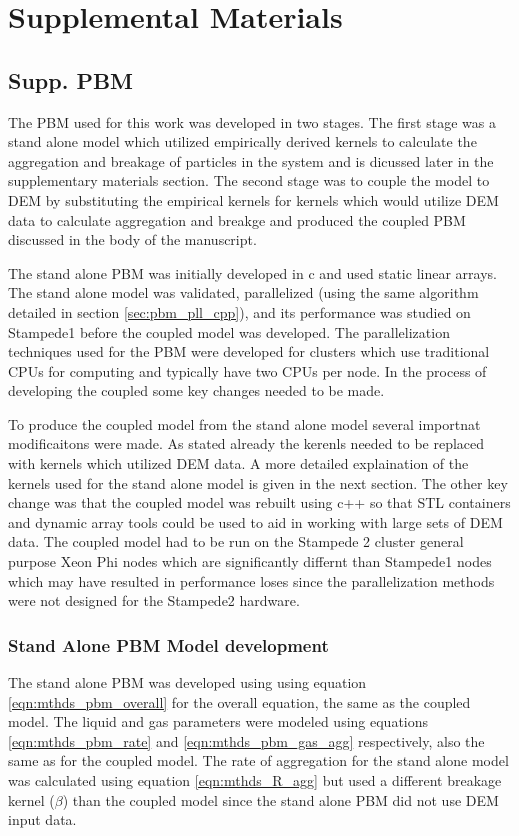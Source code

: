 
\section{Supplemental Materials}

\subsection{Supp. PBM}
\label{sec:supp_pbm_model}

	The PBM used for this work was developed in two stages. The first stage was a stand alone model 
which utilized empirically derived kernels to calculate the aggregation and breakage of particles in the system and is dicussed later in the supplementary materials section. The second stage was to couple the model to DEM by 
substituting the empirical kernels for kernels which would utilize DEM data to calculate aggregation and breakge and produced the coupled PBM discussed in the body of the manuscript. 
	
	The stand alone PBM was initially developed in c  and used static linear arrays. The stand alone model was validated, parallelized (using the same algorithm detailed in section \ref{sec:pbm_pll_cpp}), and its performance was studied on Stampede1 before the coupled model was developed. The parallelization techniques used for the PBM were developed for clusters which use traditional CPUs for computing and typically have two CPUs per node. In the process of developing the coupled some key changes needed to be made. 
	
	To produce the coupled model from the stand alone model several importnat modificaitons were made. As stated already the kerenls needed to be replaced with kernels which utilized DEM data. A more detailed explaination of the kernels used for the stand alone model is given in the next section. The other key change was that the coupled model was rebuilt using c++ so that STL containers and dynamic array tools could be used to aid in working with large sets of DEM data. The coupled model had to be run on the Stampede 2 cluster general purpose Xeon Phi nodes which are significantly differnt than Stampede1 nodes which may have resulted in performance loses since the parallelization methods were not designed for the Stampede2 hardware. 


\subsubsection{Stand Alone PBM Model development}
\label{sec:supp_sa_pbm_dev}
The stand alone PBM was developed using using equation \ref{eqn:mthds_pbm_overall} for the overall 
equation, the same as the coupled model. The liquid and gas parameters were modeled using equations \ref{eqn:mthds_pbm_rate} and \ref{eqn:mthds_pbm_gas_agg} respectively, also the same as for the coupled model. The rate of aggregation for
the stand alone model was calculated using equation \ref{eqn:mthds_R_agg} but used a different breakage kernel ($\beta$) than the coupled model since the stand alone PBM did not use DEM input data.  

